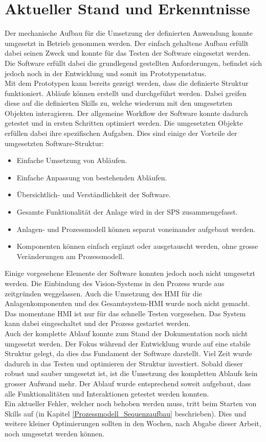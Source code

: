 \section{Aktueller Stand und Erkenntnisse} \label{Aktueller_Stand}
	Der mechanische Aufbau für die Umsetzung der definierten Anwendung konnte umgesetzt in Betrieb genommen werden. Der einfach gehaltene Aufbau erfüllt dabei seinen Zweck und konnte für das Testen der Software eingesetzt werden. Die Software erfüllt dabei die grundlegend gestellten Anforderungen, befindet sich jedoch noch in der Entwicklung und somit im Prototypenstatus. 
	\\
	Mit dem Prototypen kann bereits gezeigt werden, dass die definierte Struktur funktioniert. Abläufe können erstellt und durchgeführt werden. Dabei greifen diese auf die definierten Skills zu, welche wiederum mit den umgesetzten Objekten interagieren. Der allgemeine Workflow der Software konnte dadurch getestet und in ersten Schritten optimiert werden. Die umgesetzten Objekte erfüllen dabei ihre spezifischen Aufgaben. 
	\vspace{2mm}
	Dies sind einige der Vorteile der umgesetzten Software-Struktur:
	\begin{itemize}
		\item Einfache Umsetzung von Abläufen.
		\item Einfache Anpassung von bestehenden Abläufen.
		\item Übersichtlich- und Verständlichkeit der Software. 
		\item Gesamte Funktionalität der Anlage wird in der SPS zusammengefasst.
		\item Anlagen- und Prozessmodell können separat voneinander aufgebaut werden.
		\item Komponenten können einfach ergänzt oder ausgetauscht werden, ohne grosse Veränderungen am Prozessmodell.
	\end{itemize} 
	\vspace{3mm}
	
	Einige vorgesehene Elemente der Software konnten jedoch noch nicht umgesetzt werden. Die Einbindung des Vision-Systems in den Prozess wurde aus zeitgründen weggelassen. Auch die Umsetzung des HMI für die Anlagenkomponenten und des Gesamtsystem-HMI wurde noch nicht gemacht. Das momentane HMI ist nur für das schnelle Testen vorgesehen. Das System kann dabei eingeschaltet und der Prozess gestartet werden.
	\\
	Auch der komplette Ablauf konnte zum Stand der Dokumentation noch nicht umgesetzt werden. Der Fokus während der Entwicklung wurde auf eine stabile Struktur gelegt, da dies das Fundament der Software darstellt. Viel Zeit wurde dadurch in das Testen und optimieren der Struktur investiert. Sobald dieser robust und sauber umgesetzt ist, ist die Umsetzung des kompletten Ablaufs kein grosser Aufwand mehr. Der Ablauf wurde entsprechend soweit aufgebaut, dass alle Funktionalitäten und Interaktionen getestet werden konnten. 
	\\
	Ein aktueller Fehler, welcher noch behoben werden muss, tritt beim Starten von Skills auf (in Kapitel \ref{Prozessmodell_Sequenzaufbau} beschrieben). Dies und weitere kleiner Optimierungen sollten in den Wochen, nach Abgabe dieser Arbeit, noch umgesetzt werden können. 
	
	\newpage